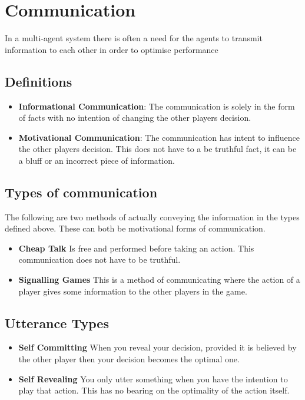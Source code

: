 \documentclass[../../main.tex]{subfiles}
\begin{document}
    \section{Communication}
    In a multi-agent system there is often a need for the agents to transmit information to each other in order to optimise performance 
    \subsection{Definitions}
        \begin{definition}
            \begin{itemize}
                \item \textbf{Informational Communication}: The communication is solely in the form of facts with no intention of changing the other players decision.
                \item\textbf{Motivational Communication}: The communication has intent to influence the other players decision. This does not have to a be truthful fact, it can be a bluff or an incorrect piece of information.
            \end{itemize}
        \end{definition}
        
    \subsection{Types of communication}
    The following are two methods of actually conveying the information in the types defined above. These can both be motivational forms of communication.
        \begin{definition}
            \begin{itemize}
                \item \textbf{Cheap Talk} Is free and performed before taking an action. This communication does not have to be truthful.
                \item \textbf{Signalling Games} This is a method of communicating where the action of a player gives some information to the other players in the game.
            \end{itemize}
        \end{definition}
        
    \subsection{Utterance Types}
        \begin{definition}
            \begin{itemize}
                \item \textbf{Self Committing} When you reveal your decision, provided it is believed by the other player then your decision becomes the optimal one.
                \item \textbf{Self Revealing} You only utter something when you have the intention to play that action. This has no bearing on the optimality of the action itself.
            \end{itemize}
        \end{definition}
        
\end{document}
